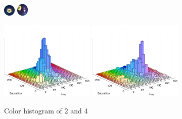 \begin{figure}[H]
\centering
\subfloat
{
	\includegraphics[width=0.05\textwidth]{images/balls/2.png}
}
\hspace{0.4\textwidth}
\subfloat
{
	\includegraphics[width=0.05\textwidth]{images/balls/4.png}
}

\subfloat
{
	\includegraphics[width=0.4\textwidth]{images/ballhist/2}
}
\subfloat
{
	\includegraphics[width=0.4\textwidth]{images/ballhist/4}
}
\caption{Color histogram of 2 and 4}
\label{fig:wrongcamera}
\end{figure}